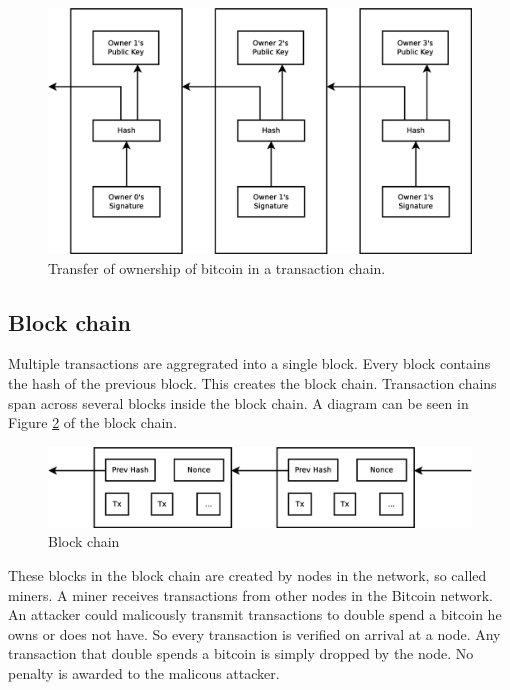 \begin{figure}
	\centerline{\includegraphics[scale=0.3]{relatedWork/figs/transactions.eps}}
	\caption{Transfer of ownership of bitcoin in a transaction chain.}
	\label{fig:bt-transaction-chain}
\end{figure}

\subsection{Block chain}
Multiple transactions are aggregrated into a single block.
Every block contains the hash of the previous block.
This creates the block chain.
Transaction chains span across several blocks inside the block chain.
A diagram can be seen in Figure \ref{fig:bt-block-chain} of the block chain.

\begin{figure}
        \centerline{\includegraphics[scale=0.3]{relatedWork/figs/blocks.eps}}
        \caption{Block chain}
        \label{fig:bt-block-chain}
\end{figure}

These blocks in the block chain are created by nodes in the network, so called miners.
A miner receives transactions from other nodes in the Bitcoin network.
An attacker could malicously transmit transactions to double spend a bitcoin he owns or does not have.
So every transaction is verified on arrival at a node.
Any transaction that double spends a bitcoin is simply dropped by the node.
No penalty is awarded to the malicous attacker.

